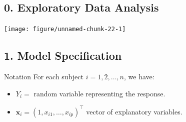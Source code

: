 \documentclass[oneside]{book}\usepackage[]{graphicx}\usepackage[svgnames]{xcolor}
\newenvironment{knitrout}{}{} %
\providecommand{\Vector}[1]{\bm{#1}}%
\begin{document}
\subsection*{0. Exploratory Data Analysis}
\begin{knitrout}
\color{fgcolor}

{\centering \texttt{[image: figure/unnamed-chunk-22-1]} 

}


\end{knitrout}
\subsection*{1. Model Specification}
\begin{Regular}{Notation}
      For each subject $ i=1,2,\ldots,n $, we have:
      \begin{itemize}
            \item $ Y_i= $ random variable representing the response.
            \item $ \Vector{x}_i=(1,x_{i1},\ldots,x_{ip})^\top $ vector of explanatory variables.
      \end{itemize}
\end{Regular}
\end{document}
